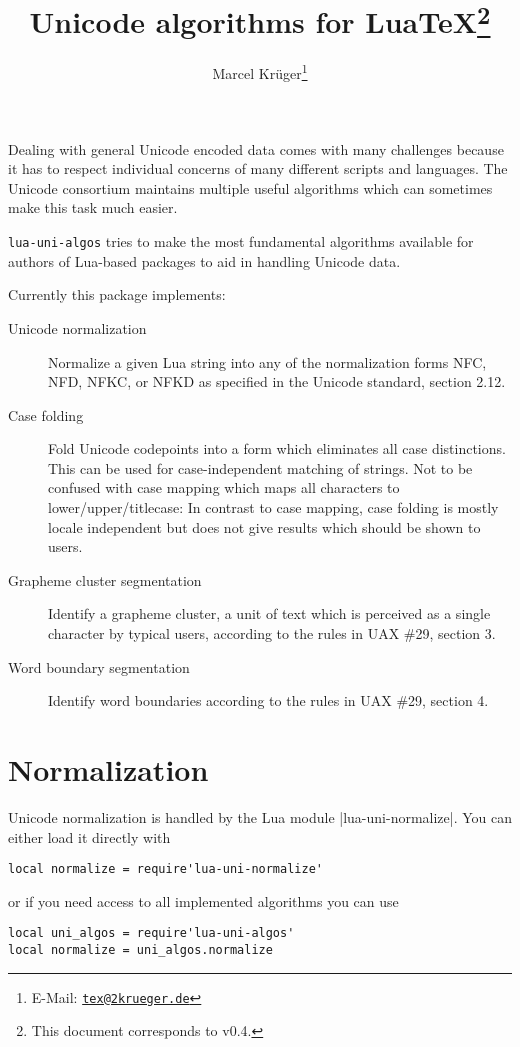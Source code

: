 \documentclass{article}
\title{Unicode algorithms for Lua\TeX\thanks{This document corresponds to \pkg{lua-uni-algos} v0.4.}}
\author{Marcel Krüger\thanks{E-Mail: \href{mailto:tex@2krueger.de}{\nolinkurl{tex@2krueger.de}}}}
\newcommand\pkg{\texttt}
\begin{document}
\maketitle
Dealing with general Unicode encoded data comes with many challenges because it has to respect individual concerns of many different scripts and languages. The Unicode consortium maintains multiple useful algorithms which can sometimes make this task much easier.

\pkg{lua-uni-algos} tries to make the most fundamental algorithms available for authors of Lua-based packages to aid in handling Unicode data.

Currently this package implements:
\begin{description}
  \item[Unicode normalization] Normalize a given Lua string into any of the normalization forms NFC, NFD, NFKC, or NFKD as specified in the Unicode standard, section 2.12.
  \item[Case folding] Fold Unicode codepoints into a form which eliminates all case distinctions. This can be used for case-independent matching of strings. Not to be confused with case mapping which maps all characters to lower/upper/titlecase: In contrast to case mapping, case folding is mostly locale independent but does not give results which should be shown to users.
  \item[Grapheme cluster segmentation] Identify a grapheme cluster, a unit of text which is perceived as a single character by typical users, according to the rules in UAX \#29, section 3.
  \item[Word boundary segmentation] Identify word boundaries according to the rules in UAX \#29, section 4.
\end{description}
\section{Normalization}
Unicode normalization is handled by the Lua module |lua-uni-normalize|.
You can either load it directly with
\begin{verbatim}
local normalize = require'lua-uni-normalize'
\end{verbatim}
or if you need access to all implemented algorithms you can use
\begin{verbatim}
local uni_algos = require'lua-uni-algos'
local normalize = uni_algos.normalize
\end{verbatim}
\end{document}
